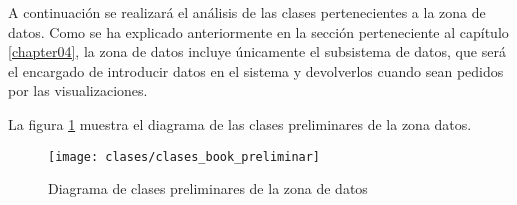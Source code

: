 A continuación se realizará el análisis de las clases pertenecientes a la zona de datos. Como se ha explicado anteriormente en la sección  perteneciente al capítulo \ref{chapter04}, la zona de datos incluye únicamente el subsistema de datos, que será el encargado de introducir datos en el sistema y devolverlos cuando sean pedidos por las visualizaciones.

La figura \ref{fig:clases_preliminares_modelo_book} muestra el diagrama de las clases preliminares de la zona datos.

\begin{landscape}
	\begin{figure}[ht]
		\centering
		\texttt{[image: clases/clases\_book\_preliminar]}
		\caption{Diagrama de clases preliminares de la zona de datos}
		\label{fig:clases_preliminares_modelo_book}
	\end{figure}
\end{landscape}


